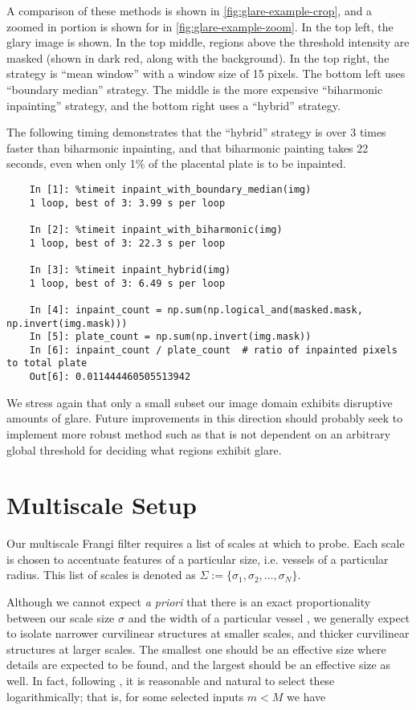 	A comparison of these methods is shown in \cref{fig:glare-example-crop}, and a zoomed in portion is shown
	for in \cref{fig:glare-example-zoom}. In the top left, the glary image is shown.  In the top middle,
	regions above the threshold intensity are masked (shown in dark red, along with the background). In the top right, the strategy is ``mean window'' with a window size of 15 pixels. The bottom left uses ``boundary median'' strategy. The middle is the more expensive ``biharmonic inpainting'' strategy, and the bottom right uses a ``hybrid'' strategy.
	
	The following timing demonstrates that the ``hybrid'' strategy is over 3 times faster than biharmonic inpainting, and that biharmonic painting takes 22 seconds, even when only 1\% of the placental plate is to be inpainted.
	
	\begin{lstlisting}
	In [1]: %timeit inpaint_with_boundary_median(img)
	1 loop, best of 3: 3.99 s per loop
	
	In [2]: %timeit inpaint_with_biharmonic(img)
	1 loop, best of 3: 22.3 s per loop
	
	In [3]: %timeit inpaint_hybrid(img)
	1 loop, best of 3: 6.49 s per loop
	
	In [4]: inpaint_count = np.sum(np.logical_and(masked.mask, np.invert(img.mask)))
	In [5]: plate_count = np.sum(np.invert(img.mask))
	In [6]: inpaint_count / plate_count  # ratio of inpainted pixels to total plate 
	Out[6]: 0.011444460505513942
	\end{lstlisting}

	
	We stress again that only a small subset our image domain exhibits disruptive amounts of glare.
	Future improvements in this direction should probably seek to implement more robust method such as \cite{lange2005glare} that is not dependent on an arbitrary global threshold for deciding what regions exhibit glare.
	
	
\section{Multiscale Setup}

	Our multiscale Frangi filter requires a list of scales at which to probe. Each scale is chosen to accentuate features of a particular size, i.e. vessels of a particular radius.
	This list of scales is denoted as $\Sigma := \{ \sigma_1, \sigma_2, \dots, \sigma_N\}$. 
	
	
	Although we cannot expect \textit{a priori} that there is an exact proportionality between our scale size $\sigma$ and the width of a particular vessel \cite{frangi-paper}, we generally expect to isolate
	narrower curvilinear structures at smaller scales, and thicker curvilinear structures at larger scales.	The smallest one should be an effective size where details are expected to be found, and the largest should be an effective size as well. In fact, following \cite{Koenderink}, it is reasonable and natural to select these logarithmically; that is, for some selected inputs $m < M$ we have
	
